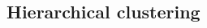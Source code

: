\documentclass[10pt, french]{article}
\begin{document}
\begin{multicols*}{3}
\subsection*{Hierarchical clustering}

\end{multicols*}
\end{document}
